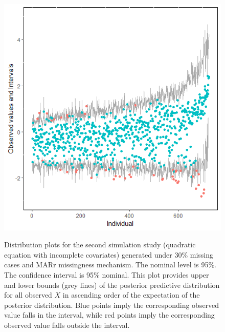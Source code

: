 \documentclass[12pt, fullpage, a4paper]{article}
\begin{document}
\begin{figure}
\begin{center}
{{				\includegraphics[scale=.5]{plots/plot6.10}
			}
		}
	\end{center}
	\caption{Distribution plots for the second simulation study (quadratic equation with incomplete covariates) generated under 30\% missing cases and MARr missingness mechanism. The nominal level is 95\%. The confidence interval is 95\% nominal. This plot provides upper and lower bounds (grey lines) of the posterior predictive distribution for all observed $X$ in ascending order of the expectation of the posterior distribution. Blue points imply the corresponding observed value falls in the interval, while red points imply the corresponding observed value falls outside the interval.}
	\label{fig6_5}
\end{figure}
\end{document}
